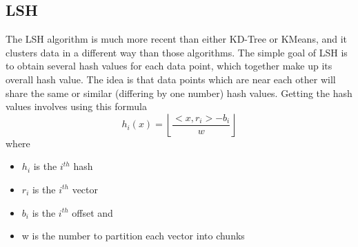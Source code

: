 \documentclass[journal]{IEEEtran}
\begin{document}
\subsection{LSH}
The LSH algorithm \cite{lsh-1,lsh-2,lsh-3} is much more recent than either KD-Tree or KMeans, and it clusters data in a different way than those algorithms. The simple goal of LSH is to obtain several hash values for each data point, which together make up its overall hash value. The idea is that data points which are near each other will share the same or similar (differing by one number) hash values. Getting the hash values involves using this formula
$$h_i(x) = \left \lfloor{\frac{<x, r_i> - b_i}{w}}\right \rfloor $$
 where
 \begin{itemize}
  \item $h_i$ is the $i^{th}$ hash
  \item $r_i$ is the $i^{th}$ vector
  \item $b_i$ is the $i^{th}$ offset and
  \item w is the number to partition each vector into chunks
 \end{itemize}
\end{document}
